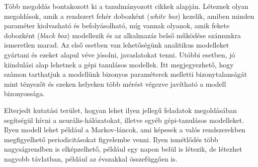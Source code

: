 Több megoldás bontakozott ki a tanulmányozott cikkek alapján. Léteznek olyan megoldások, amik a rendszert fehér dobozként (\textit{white box}) kezelik, amiben minden paraméter kiolvasható és befolyásolható, míg vannak olyanok, amik fekete dobozként (\textit{black box}) modellezik és az alkalmazás belső működése számunkra ismeretlen marad\citep{TowardsAnAdaptive}. Az első esetben van lehetőségünk analitikus modelleket gyártani és ezeket alapul véve jósolni, javaslatokat tenni. Utóbbi esetben, jó kiindulási alap lehetnek a gépi tanulásos modellek. Itt megjegyezhető, hogy számon tarthatjuk a modellünk bizonyos paraméterek melletti bizonytalanságát mint tényezőt és ezeken helyeken több mérést végezve javítható a modell bizonyossága\citep{TowardsAnAdaptive}.

Elterjedt kutatási terület, hogyan lehet ilyen jellegű feladatok megoldásában segítségül hívni a neurális-hálózatokat, illetve egyéb gépi-tanulásos modelleket. Ilyen modell lehet például a Markov-láncok, ami képesek a valós rendszerekben megfigyelhető periodicitásokat figyelembe venni\citep{CloudScale}. Ilyen ismétlődés több nagyságrendben is elképzelhető, például egy napon belül is létezik, de létezhet nagyobb távlatban, például az évszakkal összefüggően is\citep{PredictingUsageAndProactiveScaling}.




